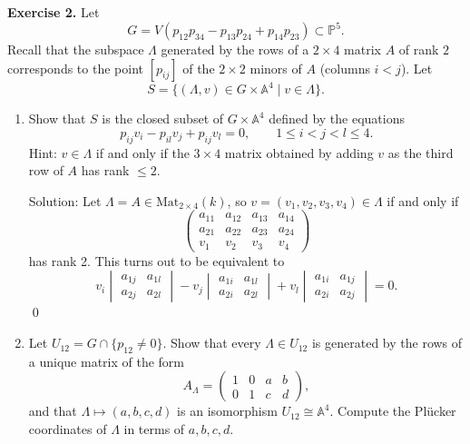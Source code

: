 \bigskip
\noindent\textbf{Exercise 2.} Let
\[
G=V(p_{12}p_{34}-p_{13}p_{24}+p_{14}p_{23})\subset\mathbb{P}^5.
\]
Recall that the subspace $\Lambda$ generated by the rows of a $2\times 4$ matrix $A$ of rank $2$ corresponds to the point $[p_{ij}]$ of the $2\times 2$ minors of $A$ (columns $i<j$). Let
\[
S=\{(\Lambda,v)\in G\times\mathbb{A}^4\mid v\in\Lambda\}.
\]
\begin{enumerate}
\item[(a)] Show that $S$ is the closed subset of $G\times\mathbb{A}^4$ defined by the equations
\[
p_{ij}v_i-p_{il}v_j+p_{ij}v_l=0,\qquad 1\le i<j<l\le 4.
\]
Hint: $v\in\Lambda$ if and only if the $3\times 4$ matrix obtained by adding $v$ as the third row of $A$ has rank $\le 2$.\par 

Solution: Let $\Lambda = A\in\text{Mat}_{2\times 4}(k)$, so $v=(v_1,v_2,v_3,v_4)\in \Lambda$ if and only if 
\begin{equation}
    \begin{pmatrix}
a_{11} & a_{12} & a_{13} & a_{14} \\
a_{21} & a_{22} & a_{23} & a_{24} \\
v_1 & v_2 & v_3 & v_4
\end{pmatrix}
\end{equation}
has rank 2. This turns out to be equivalent to 
\begin{equation}
    v_i \begin{vmatrix}
a_{1j} & a_{1l}\\
a_{2j} & a_{2l}
\end{vmatrix} - v_j \begin{vmatrix}
a_{1i} & a_{1l}\\
a_{2i} & a_{2l}
\end{vmatrix} + v_l \begin{vmatrix}
a_{1i} & a_{1j}\\
a_{2i} & a_{2j}
\end{vmatrix} = 0.
\end{equation}
\qed

\item[(b)] Let $U_{12}=G\cap\{p_{12}\neq 0\}$. Show that every $\Lambda\in U_{12}$ is generated by the rows of a unique matrix of the form
\[
A_\Lambda=\begin{pmatrix}1&0&a&b\\0&1&c&d\end{pmatrix},
\]
and that $\Lambda\mapsto(a,b,c,d)$ is an isomorphism $U_{12}\cong\mathbb{A}^4$. 
Compute the Plücker coordinates of $\Lambda$ in terms of $a,b,c,d$.\par 


\end{enumerate}
